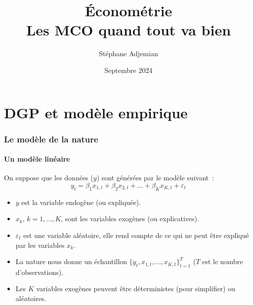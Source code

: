 \documentclass[10pt]{beamer}
\theoremstyle{plain}
\begin{document}
\title{Économétrie\\\small{Les MCO quand tout va bien}}
\author[S. Adjemian]{Stéphane Adjemian}
\date{Septembre 2024}

\begin{frame}
  \titlepage{}
\end{frame}

\section{DGP et modèle empirique}

\begin{frame}
  \frametitle{Le modèle de la nature}
  \framesubtitle{Un modèle linéaire}

  \bigskip

  On suppose que les données ($y$) sont générées par le modèle suivant~:
  \[
    y_t = \beta_1x_{1,t} + \beta_2x_{2,t} + \dots + \beta_Kx_{K,t} + \varepsilon_t
  \]

  \bigskip

  \begin{itemize}
  
  \item $y$ est la variable endogène (ou expliquée).\newline

  \item $x_{k}$, $k=1,\ldots,K$, sont les variables exogènes (ou explicatives).\newline

  \item $\varepsilon_t$ est une variable aléatoire, elle rend compte de ce qui ne peut être expliqué par les variables $x_k$.\newline

  \item La nature nous donne un échantillon $\{y_t,x_{1,t},\ldots,x_{K,t}\}_{t=1}^T$ ($T$ est le nombre d'observations).\newline

  \item Les $K$ variables exogènes peuvent être déterministes (pour simplifier) ou aléatoires.\newline

  \end{itemize}

\end{frame}
\end{document}
